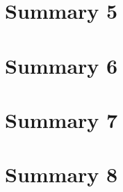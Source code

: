 \documentclass[12pt]{article} %
\begin{document}
\section{Summary 5} %

\section{Summary 6} %

\section{Summary 7} %

\section{Summary 8} %



\newpage

\nocite{*}


 

\end{document}
